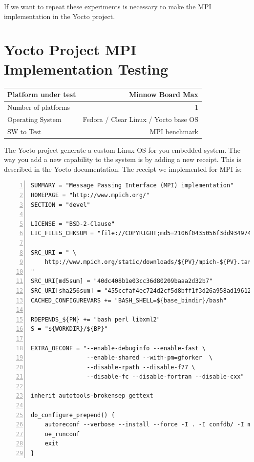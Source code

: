 If we want to repeat these experiments is necessary to make the MPI
implementation in the Yocto project. 


\section{Yocto Project MPI Implementation Testing}

    \begin{center}
    \begin{tabular}{ | l | r |}
        \hline
        Platform under test & Minnow Board  Max \\ \hline
        Number of platforms  & 1  \\ \hline
        Operating System & Fedora / Clear Linux / Yocto base OS  \\ \hline
        SW to Test & MPI benchmark \\ \hline
    \end{tabular}
    \end{center}

The Yocto project \cite{yocto-project} generate a custom Linux OS for you
embedded system. The way you add a new capability to the system is by adding a
new receipt. This is described in the Yocto documentation. The receipt we
implemented for MPI is: 

\begin{minipage}{\textwidth}
\end{minipage}

\begin{minipage}{\textwidth}

\begin{lstlisting}[frame=single,numbers=left,breaklines=true]
SUMMARY = "Message Passing Interface (MPI) implementation"
HOMEPAGE = "http://www.mpich.org/"
SECTION = "devel"

LICENSE = "BSD-2-Clause"
LIC_FILES_CHKSUM = "file://COPYRIGHT;md5=2106f0435056f3dd9349747a766e5816"

SRC_URI = " \
	http://www.mpich.org/static/downloads/${PV}/mpich-${PV}.tar.gz \
"
SRC_URI[md5sum] = "40dc408b1e03cc36d80209baaa2d32b7"
SRC_URI[sha256sum] = "455ccfaf4ec724d2cf5d8bff1f3d26a958ad196121e7ea26504fd3018757652d"
CACHED_CONFIGUREVARS += "BASH_SHELL=${base_bindir}/bash"

RDEPENDS_${PN} += "bash perl libxml2"
S = "${WORKDIR}/${BP}"

EXTRA_OECONF = "--enable-debuginfo --enable-fast \
                --enable-shared --with-pm=gforker  \
		        --disable-rpath --disable-f77 \
                --disable-fc --disable-fortran --disable-cxx"

inherit autotools-brokensep gettext

do_configure_prepend() {
    autoreconf --verbose --install --force -I . -I confdb/ -I maint/
    oe_runconf
    exit
}

\end{lstlisting}

\end{minipage}

